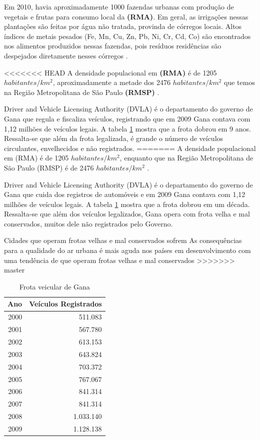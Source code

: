 
Em 2010, havia aproximadamente 1000 fazendas urbanas com produção de vegetais e
frutas para consumo local da \textbf{(RMA)}. Em geral, as irrigações nessas plantações
são feitas por água não tratada, provinda de córregos locais. 
Altos índices de metais pesados (Fe, Mn, Cu, Zn, Pb, Ni, Cr, Cd, Co)
são encontrados nos alimentos produzidos nessas fazendas, pois resíduos
residências são despejados diretamente nesses córregos \citep{lente2014}.

<<<<<<< HEAD
A densidade populacional em \textbf{(RMA)} é de 1205 $habitantes/km^2$, 
aproximadamente a metade dos 2476 $habitantes/km^2$ que temos na 
Região Metropolitana de São Paulo \textbf{(RMSP)} \citep{ibge2011}. 

Driver and Vehicle Licensing Authority (DVLA) é o
departamento do governo de Gana que regula e fiscaliza veículos, 
registrando que em 2009 Gana contava com 1,12 milhões de veículos legais. 
A tabela \ref{table:dvla} mostra que a frota dobrou em 9 anos.
Ressalta-se que além da frota legalizada, é grande o número de veículos circulantes, 
envelhecidos e não registrados. 
=======
A densidade populacional em (RMA) é de 1205 $habitantes/km^2$, 
enquanto que na Região Metropolitana de São Paulo (RMSP) é de 
2476 $habitantes/km^2$ \citep{ibge2011}. 

Driver and Vehicle Licensing Authority (DVLA) é o
departamento do governo de Gana que cuida dos registros de automóveis
e em 2009 Gana contava com 1,12 milhões de veículos legais. 
A tabela \ref{table:dvla} mostra que a frota dobrou em um década.
Ressalta-se que além dos veículos legalizados, Gana opera com frota velha e 
mal conservados, muitos dele não registrados pelo Governo. 

Cidades que operam frotas velhas e mal conservados sofrem 
As consequências para a qualidade do ar urbana é mais aguda nos países em desenvolvimento
com uma tendência de que operam frotas velhas e mal conservados
>>>>>>> master

\begin{table}[H]
 \centering
  \begin{tabular}{rr}
  \hline
  Ano & Veículos Registrados \\ 
  \hline
  2000 & 511.083 \\ 
  2001 & 567.780 \\ 
  2002 & 613.153 \\ 
  2003 & 643.824 \\ 
  2004 & 703.372 \\ 
  2005 & 767.067 \\ 
  2006 & 841.314 \\ 
  2007 & 841.314 \\ 
  2008 & 1.033.140 \\ 
  2009 & 1.128.138 \\ 
  \hline
  \end{tabular}
  \caption{Frota veicular de Gana \citep{dvla} \label{table:dvla}}
\end{table}

